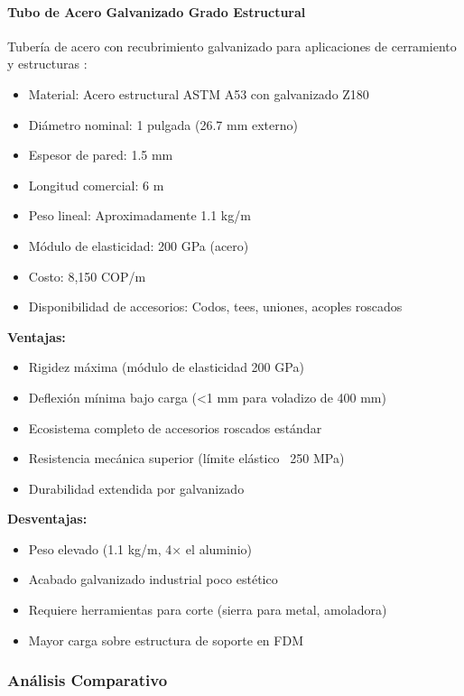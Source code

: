 \paragraph{Tubo de Acero Galvanizado Grado Estructural}

Tubería de acero con recubrimiento galvanizado para aplicaciones de cerramiento y estructuras \cite{Acero2024Galvanizado}:

\begin{itemize}
    \item Material: Acero estructural ASTM A53 con galvanizado Z180
    \item Diámetro nominal: 1 pulgada (26.7 mm externo)
    \item Espesor de pared: 1.5 mm
    \item Longitud comercial: 6 m
    \item Peso lineal: Aproximadamente 1.1 kg/m
    \item Módulo de elasticidad: 200 GPa (acero)
    \item Costo: 8,150 COP/m
    \item Disponibilidad de accesorios: Codos, tees, uniones, acoples roscados
\end{itemize}

\textbf{Ventajas:}
\begin{itemize}
    \item Rigidez máxima (módulo de elasticidad 200 GPa)
    \item Deflexión mínima bajo carga (<1 mm para voladizo de 400 mm)
    \item Ecosistema completo de accesorios roscados estándar
    \item Resistencia mecánica superior (límite elástico ~250 MPa)
    \item Durabilidad extendida por galvanizado
\end{itemize}

\textbf{Desventajas:}
\begin{itemize}
    \item Peso elevado (1.1 kg/m, 4× el aluminio)
    \item Acabado galvanizado industrial poco estético
    \item Requiere herramientas para corte (sierra para metal, amoladora)
    \item Mayor carga sobre estructura de soporte en FDM
\end{itemize}

\subsubsection{Análisis Comparativo}

